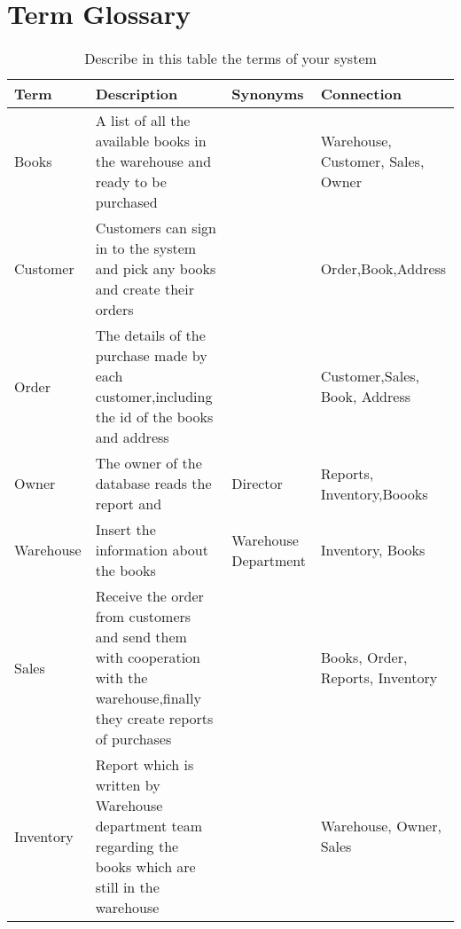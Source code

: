 \section{Term Glossary}




%

\begin{longtable}{|p{}|p{} |p{}|p{}|} 
\hline
\textbf{Term} & \textbf{Description} & \textbf{Synonyms} & \textbf{Connection} 
\\\hline

Books         & A list of all the available books in the warehouse and ready to be purchased   &                   & Warehouse, Customer, Sales, Owner \\ \hline
Customer      & Customers can sign in to the system and pick any books and create their orders  &                   & Order,Book,Address \\ \hline
Order         & The details of the purchase made by each customer,including the id of the books and address &       & Customer,Sales, Book, Address  \\ \hline
Owner      & The owner of the database reads the report and     &  Director                & Reports, Inventory,Boooks \\ \hline
Warehouse   & Insert the information about the books             & Warehouse Department    & Inventory, Books \\ \hline
Sales       & Receive the order from customers and send them with cooperation with the warehouse,finally they create reports of purchases   &               & Books, Order, Reports, Inventory \\ \hline
Inventory     & Report which is written by Warehouse department team regarding the books which are still in the warehouse &     &Warehouse, Owner, Sales 

\hline
\caption{Describe in this table the terms of your system}
\label{tab:termGlossary}
\end{longtable}